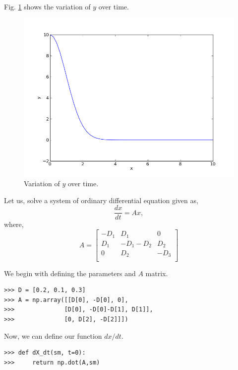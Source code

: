 \documentclass[10pt]{book}
\begin{document}
Fig. \ref{fig:ode} shows the variation of $y$ over time. 

\beforefig
\begin{figure}[h!]
  \centering
    \includegraphics[scale=0.5]{images/ode.png}
  \caption{Variation of $y$ over time.}
   \label{fig:ode}
\end{figure}
\afterfig

Let us, solve a system of ordinary differential equation given as,
\begin{equation}
\frac{dx}{dt} = Ax,
\end{equation}
where,
\begin{equation}
A = \begin{bmatrix}
  -D_1 & D_1 & 0 \\
  D_1 & -D_1-D_2 & D_2 \\
  0 & D_2 & -D_3\\
 \end{bmatrix}
\end{equation}

We begin with defining the parameters and $A$ matrix. 
\beforeverb \begin{verbatim}
>>> D = [0.2, 0.1, 0.3]
>>> A = np.array([[D[0], -D[0], 0],
>>>              [D[0], -D[0]-D[1], D[1]],
>>>              [0, D[2], -D[2]]])
\end{verbatim} \afterverb

Now, we can define our function $dx/dt$. 
\beforeverb \begin{verbatim}                 
>>> def dX_dt(sm, t=0):
>>>     return np.dot(A,sm)
\end{verbatim} \afterverb
\end{document}
